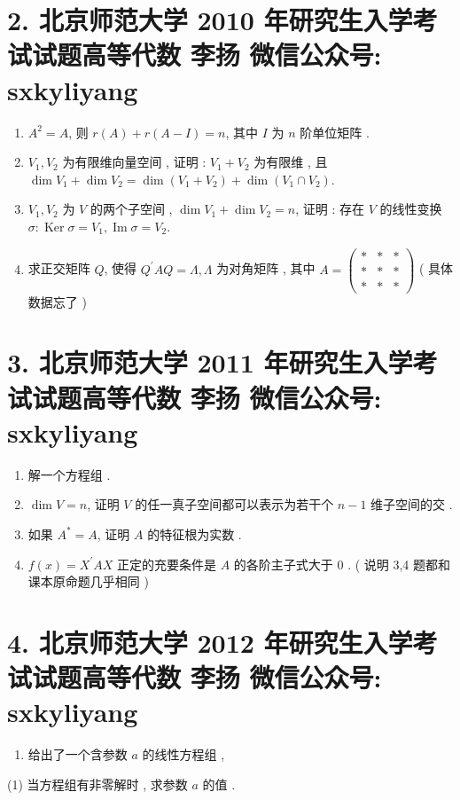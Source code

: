 \documentclass[10pt]{article}
\begin{document}
{\begin{enumerate}
\end{enumerate}
\section{2. 北京师范大学 2010 年研究生入学考试试题高等代数 
 李扬 
 微信公众号: sxkyliyang}
\begin{enumerate}
  \item $A^{2}=A$,  则  $r(A)+r(A-I)=n$,  其中  $I$  为  $n$  阶单位矩阵 .

  \item $V_{1}, V_{2}$  为有限维向量空间 ,  证明 : $V_{1}+V_{2}$  为有限维 ,  且  $\operatorname{dim} V_{1}+\operatorname{dim} V_{2}=\operatorname{dim}\left(V_{1}+V_{2}\right)+\operatorname{dim}\left(V_{1} \cap V_{2}\right)$.

  \item $V_{1}, V_{2}$  为  $V$  的两个子空间 , $\operatorname{dim} V_{1}+\operatorname{dim} V_{2}=n$,  证明 :  存在  $V$  的线性变换  $\sigma: \operatorname{Ker} \sigma=V_{1}, \operatorname{Im} \sigma=V_{2}$.

  \item  求正交矩阵  $Q$,  使得  $Q^{\prime} A Q=\Lambda, \Lambda$  为对角矩阵 ,  其中  $A=\left(\begin{array}{ccc}* & * & * \\ * & * & * \\ * & * & *\end{array}\right)$ ( 具体数据忘了 )

\end{enumerate}
\section{3. 北京师范大学 2011 年研究生入学考试试题高等代数 
 李扬 
 微信公众号: sxkyliyang}
\begin{enumerate}
  \item  解一个方程组 .

  \item $\operatorname{dim} V=n$,  证明  $V$  的任一真子空间都可以表示为若干个  $n-1$  维子空间的交 .

  \item  如果  $A^{*}=A$,  证明  $A$  的特征根为实数 .

  \item $f(x)=X^{\prime} A X$  正定的充要条件是  $A$  的各阶主子式大于  0 . ( 说明  3,4  题都和课本原命题几乎相同 )

\end{enumerate}
\section{4. 北京师范大学 2012 年研究生入学考试试题高等代数 
 李扬 
 微信公众号: sxkyliyang}
\begin{enumerate}
  \item  给出了一个含参数  $a$  的线性方程组 ,
\end{enumerate}
(1)  当方程组有非零解时 ,  求参数  $a$  的值 .

}
\end{document}

